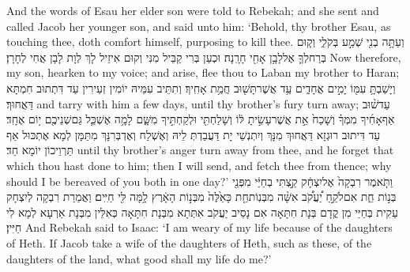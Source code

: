 {And the words of Esau her elder son were told to Rebekah; and she sent and called Jacob her younger son, and said unto him: ‘Behold, thy brother Esau, as touching thee, doth comfort himself, purposing to kill thee.}{}
{וְעַתָּ֥ה בְנִ֖י שְׁמַ֣ע בְּקֹלִ֑י וְק֧וּם בְּרַח\maqqaf לְךָ֛ אֶל\maqqaf לָבָ֥ן אָחִ֖י חָרָֽנָה׃}
{וּכְעַן בְּרִי קַבֵּיל מִנִּי וְקוּם אִיזֵיל לָךְ לְוָת לָבָן אֲחִי לְחָרָן׃}
{Now therefore, my son, hearken to my voice; and arise, flee thou to Laban my brother to Haran;}{}
{וְיָשַׁבְתָּ֥ עִמּ֖וֹ יָמִ֣ים אֲחָדִ֑ים עַ֥ד אֲשֶׁר\maqqaf תָּשׁ֖וּב חֲמַ֥ת אָחִֽיךָ׃}
{וְתִתֵּיב עִמֵּיהּ יוֹמִין זְעֵירִין עַד דִּתְתוּב חִמְתָּא דַּאֲחוּךְ׃}
{and tarry with him a few days, until thy brother’s fury turn away;}{}
{עַד\maqqaf שׁ֨וּב אַף\maqqaf אָחִ֜יךָ מִמְּךָ֗ וְשָׁכַח֙ אֵ֣ת אֲשֶׁר\maqqaf עָשִׂ֣יתָ לּ֔וֹ וְשָׁלַחְתִּ֖י וּלְקַחְתִּ֣יךָ מִשָּׁ֑ם לָמָ֥ה אֶשְׁכַּ֛ל גַּם\maqqaf שְׁנֵיכֶ֖ם י֥וֹם אֶחָֽד׃}
{עַד דִּיתוּב רוּגְזָא דַּאֲחוּךְ מִנָּךְ וְיִתְנְשֵׁי יָת דַּעֲבַדְתְּ לֵיהּ וְאֶשְׁלַח וְאֶדְבְּרִנָּךְ מִתַּמָּן לְמָא אֶתְכּוּל אַף תַּרְוֵיכוֹן יוֹמָא חַד׃}
{until thy brother’s anger turn away from thee, and he forget that which thou hast done to him; then I will send, and fetch thee from thence; why should I be bereaved of you both in one day?’}{}
{וַתֹּ֤אמֶר רִבְקָה֙ אֶל\maqqaf יִצְחָ֔ק \footnotesize קַ֣\normalsize צְתִּי בְחַיַּ֔י מִפְּנֵ֖י בְּנ֣וֹת חֵ֑ת אִם\maqqaf לֹקֵ֣חַ יַ֠עֲקֹ֠ב אִשָּׁ֨ה מִבְּנֽוֹת\maqqaf חֵ֤ת כָּאֵ֙לֶּה֙ מִבְּנ֣וֹת הָאָ֔רֶץ לָ֥מָּה לִּ֖י חַיִּֽים׃}
{וַאֲמַרַת רִבְקָה לְיִצְחָק עַקִית בְּחַיַּי מִן קֳדָם בְּנָת חִתָּאָה אִם נָסֵיב יַעֲקֹב אִתְּתָא מִבְּנָת חִתָּאָה כְּאִלֵּין מִבְּנָת אַרְעָא לְמָא לִי חַיִּין׃}
{And Rebekah said to Isaac: ‘I am weary of my life because of the daughters of Heth. If Jacob take a wife of the daughters of Heth, such as these, of the daughters of the land, what good shall my life do me?’}{}
